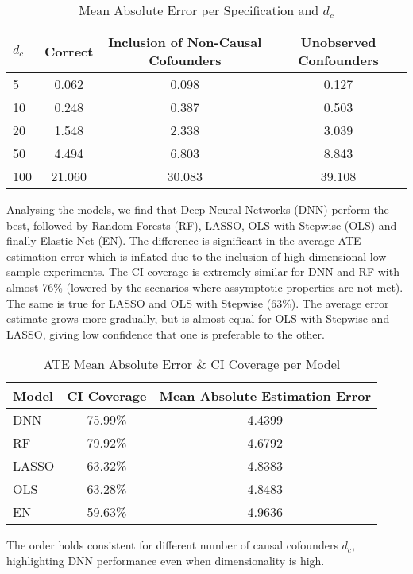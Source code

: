 \documentclass{article}
\numberwithin{equation}{section}
\begin{document}
\begin{table}[H]
    \centering
    \begin{tabular}{lccc}
        \toprule
        $d_c$ & Correct & Inclusion of Non-Causal Cofounders & Unobserved Confounders \\
        \midrule
        5 & 0.062 & 0.098 & 0.127 \\
        10 & 0.248 & 0.387 & 0.503 \\
        20 & 1.548 & 2.338 & 3.039 \\
        50 & 4.494 & 6.803 & 8.843 \\
        100 & 21.060 & 30.083 & 39.108 \\
        \bottomrule
    \end{tabular}
    \caption{Mean Absolute Error per Specification and $d_c$}
\end{table}

Analysing the models, we find that Deep Neural Networks (DNN) perform the best, followed by Random Forests (RF), LASSO, OLS with Stepwise (OLS) and finally Elastic Net (EN). The difference is significant in the average ATE estimation error which is inflated due to the inclusion of high-dimensional low-sample experiments. The CI coverage is extremely similar for DNN and RF with almost 76\% (lowered by the scenarios where assymptotic properties are not met). The same is true for LASSO and OLS with Stepwise (63\%). The average error estimate grows more gradually, but is almost equal for OLS with Stepwise and LASSO, giving low confidence that one is preferable to the other.

\begin{table}[H]
    \centering
    \begin{tabular}{lcc}
        \toprule
        Model & CI Coverage & Mean Absolute Estimation Error \\
        \midrule
        DNN     & 75.99\% & 4.4399 \\
        RF      & 79.92\% & 4.6792 \\
        LASSO   & 63.32\% & 4.8383 \\
        OLS     & 63.28\% & 4.8483 \\
        EN      & 59.63\% & 4.9636 \\
        \bottomrule
    \end{tabular}
    \caption{ATE Mean Absolute Error \& CI Coverage per Model}
\end{table}

The order holds consistent for different number of causal cofounders $d_c$, highlighting DNN performance even when dimensionality is high.
\end{document}
